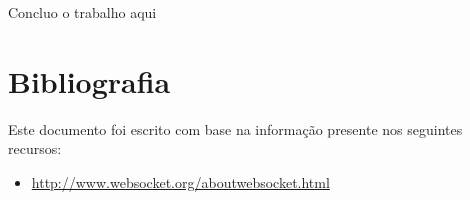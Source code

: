\documentclass[a4paper]{article}
\begin{document}
\textsf{Concluo o trabalho aqui}

\newpage

\section{Bibliografia}

\textsf{Este documento foi escrito com base na informação presente nos seguintes recursos:}
\begin{itemize}
\item \url{http://www.websocket.org/aboutwebsocket.html}
\end{itemize}
\end{document}
